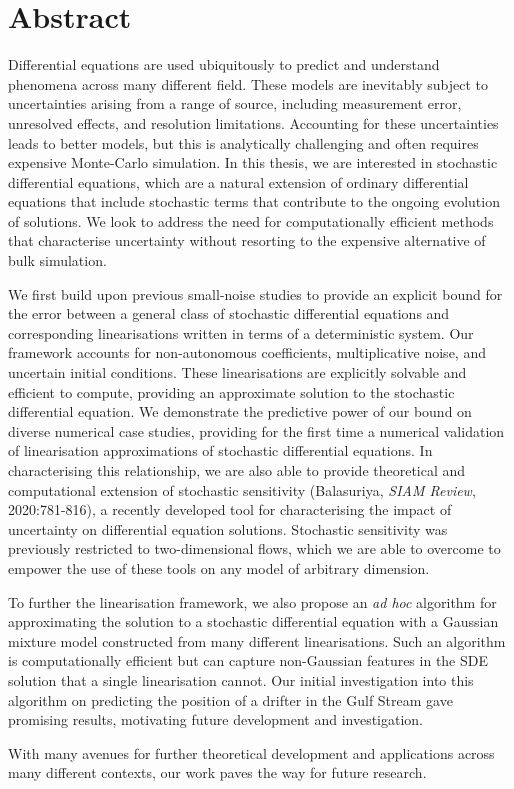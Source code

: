 \chapter{Abstract}
\label{ch:abstract}

Differential equations are used ubiquitously to predict and understand phenomena across many different field.
These models are inevitably subject to uncertainties arising from a range of source, including measurement error, unresolved effects, and resolution limitations.
Accounting for these uncertainties leads to better models, but this is analytically challenging and often requires expensive Monte-Carlo simulation.
In this thesis, we are interested in stochastic differential equations, which are a natural extension of ordinary differential equations that include stochastic terms that contribute to the ongoing evolution of solutions.
We look to address the need for computationally efficient methods that characterise uncertainty without resorting to the expensive alternative of bulk simulation.

We first build upon previous small-noise studies to provide an explicit bound for the error between a general class of stochastic differential equations and corresponding linearisations written in terms of a deterministic system.
Our framework accounts for non-autonomous coefficients, multiplicative noise, and uncertain initial conditions.
These linearisations are explicitly solvable and efficient to compute, providing an approximate solution to the stochastic differential equation.
We demonstrate the predictive power of our bound on diverse numerical case studies, providing for the first time a numerical validation of linearisation approximations of stochastic differential equations.
In characterising this relationship, we are also able to provide theoretical and computational extension of stochastic sensitivity (Balasuriya, \emph{SIAM Review}, 2020:781-816), a recently developed tool for characterising the impact of uncertainty on differential equation solutions.
Stochastic sensitivity was previously restricted to two-dimensional flows, which we are able to overcome to empower the use of these tools on any model of arbitrary dimension.

To further the linearisation framework, we also propose an \emph{ad hoc} algorithm for approximating the solution to a stochastic differential equation with a Gaussian mixture model constructed from many different linearisations.
Such an algorithm is computationally efficient but can capture non-Gaussian features in the SDE solution that a single linearisation cannot.
Our initial investigation into this algorithm on predicting the position of a drifter in the Gulf Stream gave promising results, motivating future development and investigation.

With many avenues for further theoretical development and applications across many different contexts, our work paves the way for future research.

